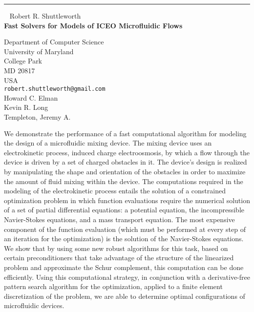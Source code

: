 \documentclass{report}
\begin{document}
\begin{center}
\rule{6in}{1pt} \
{\large 
Robert R. Shuttleworth\\
{\bf Fast Solvers for Models of ICEO Microfluidic Flows}}

Department of Computer Science \\ University of Maryland \\ College Park \\ MD 20817 \\ USA
\\
{\tt robert.shuttleworth@gmail.com}\\
Howard C. Elman \\
Kevin R. Long\\
	Templeton, Jeremy A.\end{center}

We demonstrate the performance of a fast computational algorithm
for modeling the design of a microfluidic mixing device. The mixing
device uses an electrokinetic process, induced charge
electroosmosis, by which a flow through the device is driven by a
set of charged obstacles in it. The device's design is realized by
manipulating the shape and orientation of the obstacles in order to
maximize the amount of fluid mixing within the device. The
computations required in the modeling of the electrokinetic process
entails the solution of a constrained optimization problem in which
function evaluations require the numerical solution of a set of
partial differential equations: a potential equation, the
incompressible Navier-Stokes equations, and a mass transport
equation. The most expensive component of the function evaluation
(which must be performed at every step of an iteration for the
optimization) is the solution of the Navier-Stokes equations. We
show that by using some new robust algorithms for this task, based
on certain preconditioners that take advantage of the structure of
the linearized problem and approximate the Schur complement, this
computation can be done efficiently. Using this computational
strategy, in conjunction with a derivative-free pattern search
algorithm for the optimization, applied to a finite element
discretization of the problem, we are able to determine optimal
configurations of microfluidic devices.
\end{document}
